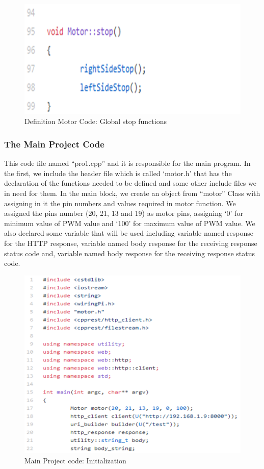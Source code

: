 \begin{figure}[h]
    \centering
    \includegraphics{figures/67.png}
    \caption{Definition Motor Code: Global stop functions}
    \label{fig:my_label}
\end{figure}

\newpage
\subsubsection{The Main Project Code}

This code file named “pro1.cpp” and it is responsible for the main program. In the first, we include the header file which is called ‘motor.h’ that has the declaration of the functions needed to be defined and some other include files we in need for them. In the main block, we create an object from “motor” Class with assigning in it the pin numbers and values required in motor function. We assigned the pins number (20, 21, 13 and 19) as motor pins, assigning ‘0’ for minimum value of PWM value and ‘100’ for maximum value of PWM value. We also declared some variable that will be used including variable named response for the HTTP response, variable named body response for the receiving response status code and, variable named body response for the receiving response status code.

\begin{figure}[h]
    \centering
    \includegraphics{figures/68.png}
    \caption{Main Project code: Initialization}
    \label{fig:my_label}
\end{figure}

